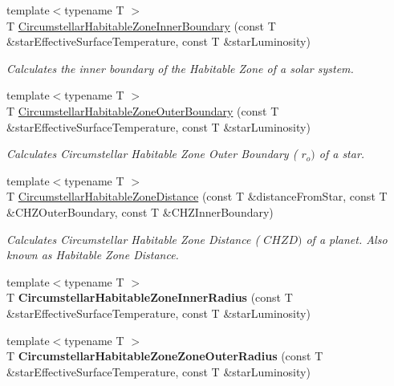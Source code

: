 \begin{DoxyCompactItemize}
{\footnotesize template$<$typename T $>$ }\\T \hyperlink{group___astrophysics_ga9ee2e8023cb444aa4638c962788b5853}{Circumstellar\+Habitable\+Zone\+Inner\+Boundary} (const T \&star\+Effective\+Surface\+Temperature, const T \&star\+Luminosity)
\begin{DoxyCompactList}\small\item\em Calculates the inner boundary of the Habitable Zone of a solar system. \end{DoxyCompactList}\item 
{\footnotesize template$<$typename T $>$ }\\T \hyperlink{group___astrophysics_gaa47fcde814ba8007de800e930fc0a08d}{Circumstellar\+Habitable\+Zone\+Outer\+Boundary} (const T \&star\+Effective\+Surface\+Temperature, const T \&star\+Luminosity)
\begin{DoxyCompactList}\small\item\em Calculates Circumstellar Habitable Zone Outer Boundary ( $r_o)$ of a star. \end{DoxyCompactList}\item 
{\footnotesize template$<$typename T $>$ }\\T \hyperlink{group___astrophysics_gacf3a720793cdb27f6d93b170b44e81be}{Circumstellar\+Habitable\+Zone\+Distance} (const T \&distance\+From\+Star, const T \&C\+H\+Z\+Outer\+Boundary, const T \&C\+H\+Z\+Inner\+Boundary)
\begin{DoxyCompactList}\small\item\em Calculates Circumstellar Habitable Zone Distance ( $CHZD)$ of a planet. Also known as Habitable Zone Distance. \end{DoxyCompactList}\item 
\mbox{\label{namespace_e_g_x_phys_abcc7fdd3086efb4c0b786960a45c02e2}} 
{\footnotesize template$<$typename T $>$ }\\T {\bfseries Circumstellar\+Habitable\+Zone\+Inner\+Radius} (const T \&star\+Effective\+Surface\+Temperature, const T \&star\+Luminosity)
\item 
\mbox{\label{namespace_e_g_x_phys_ac6f89712c52ce26e1e2085fd85a914ea}} 
{\footnotesize template$<$typename T $>$ }\\T {\bfseries Circumstellar\+Habitable\+Zone\+Zone\+Outer\+Radius} (const T \&star\+Effective\+Surface\+Temperature, const T \&star\+Luminosity)
\item 

\end{DoxyCompactItemize}
